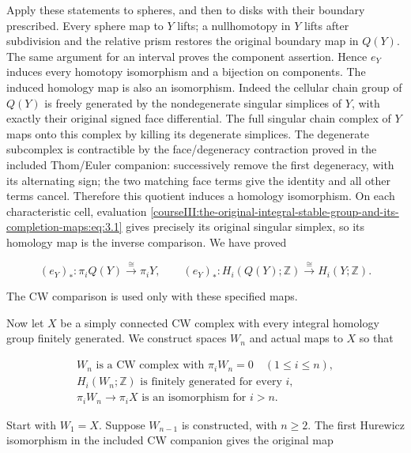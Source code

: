 Apply these statements to spheres, and then to disks with their boundary prescribed. Every sphere map to \(Y\) lifts; a nullhomotopy in \(Y\) lifts after subdivision and the relative prism restores the original boundary map in \(Q(Y)\). The same argument for an interval proves the component assertion. Hence \(e_Y\) induces every homotopy isomorphism and a bijection on components. The induced homology map is also an isomorphism. Indeed the cellular chain group of \(Q(Y)\) is freely generated by the nondegenerate singular simplices of \(Y\), with exactly their original signed face differential. The full singular chain complex of \(Y\) maps onto this complex by killing its degenerate simplices. The degenerate subcomplex is contractible by the face/degeneracy contraction proved in the included Thom/Euler companion: successively remove the first degeneracy, with its alternating sign; the two matching face terms give the identity and all other terms cancel. Therefore this quotient induces a homology isomorphism. On each characteristic cell, evaluation \eqref{courseIII:the-original-integral-stable-group-and-its-completion-maps:eq:3.1} gives precisely its original singular simplex, so its homology map is the inverse comparison. We have proved

\begin{equation}
(e_Y)_*:\pi_iQ(Y)\xrightarrow{\cong}\pi_iY,
 \qquad
 (e_Y)_*:H_i(Q(Y);\mathbb Z)\xrightarrow{\cong}H_i(Y;\mathbb Z).
 \label{courseIII:the-original-integral-stable-group-and-its-completion-maps:eq:3.2}
\end{equation}

The CW comparison is used only with these specified maps.

Now let \(X\) be a simply connected CW complex with every integral homology group finitely generated. We construct spaces \(W_n\) and actual maps to \(X\) so that

\begin{equation}
\begin{gathered}
 W_n\text{ is a CW complex with }\pi_iW_n=0\quad(1\leq i\leq n),\\
 H_i(W_n;\mathbb Z)\text{ is finitely generated for every }i,\\
 \pi_iW_n\longrightarrow\pi_iX\text{ is an isomorphism for }i>n.
 \end{gathered}
 \label{courseIII:the-original-integral-stable-group-and-its-completion-maps:eq:3.3}
\end{equation}

Start with \(W_1=X\). Suppose \(W_{n-1}\) is constructed, with \(n\geq2\). The first Hurewicz isomorphism in the included CW companion gives the original map

